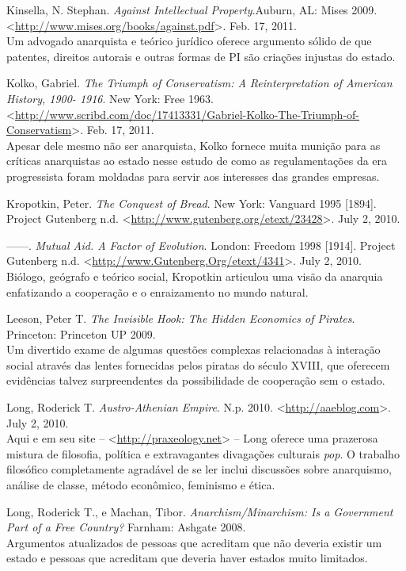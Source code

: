 \begin{hangparas}{0.25in}{1}
Kinsella, N. Stephan. \emph{Against Intellectual Property}.Auburn, AL: Mises 2009. <\url{http://www.mises.org/books/against.pdf}>. Feb. 17, 2011.\smallskip\\
Um advogado anarquista e teórico jurídico oferece argumento sólido de que patentes, direitos autorais e outras formas de PI são criações injustas do estado.

Kolko, Gabriel. \emph{The Triumph of Conservatism: A Reinterpretation of American History, 1900- 1916}. New York: Free 1963. <\url{http://www.scribd.com/doc/17413331/Gabriel-Kolko-The-Triumph-of-Conservatism}>. Feb. 17, 2011.\smallskip\\
Apesar dele mesmo não ser anarquista, Kolko fornece muita munição para as críticas anarquistas ao estado nesse estudo de como as regulamentações da era progressista foram moldadas para servir aos interesses das grandes empresas.

Kropotkin, Peter. \emph{The Conquest of Bread}. New York: Vanguard 1995 [1894]. Project Gutenberg n.d. <\url{http://www.gutenberg.org/etext/23428}>. July 2, 2010.

------. \emph{Mutual Aid. A Factor of Evolution}. London: Freedom 1998 [1914]. Project Gutenberg n.d. <\url{http://www.Gutenberg.Org/etext/4341}>. July 2, 2010.\smallskip\\
Biólogo, geógrafo e teórico social, Kropotkin articulou uma visão da anarquia enfatizando a cooperação e o enraizamento no mundo natural.

Leeson, Peter T. \emph{The Invisible Hook: The Hidden Economics of Pirates}. Princeton: Princeton UP 2009.\smallskip\\
Um divertido exame de algumas questões complexas relacionadas à interação social através das lentes fornecidas pelos piratas do século XVIII, que oferecem evidências talvez surpreendentes da possibilidade de cooperação sem o estado.

Long, Roderick T. \emph{Austro-Athenian Empire}. N.p. 2010. <\url{http://aaeblog.com}>. July 2, 2010.\smallskip\\
Aqui e em seu site -- <\url{http://praxeology.net}> -- Long oferece uma prazerosa mistura de filosofia, política e extravagantes divagações culturais \emph{pop}. O trabalho filosófico completamente agradável de se ler inclui discussões sobre anarquismo, análise de classe, método econômico, feminismo e ética.

Long, Roderick T., e Machan, Tibor. \emph{Anarchism/Minarchism: Is a Government Part of a Free Country?} Farnham: Ashgate 2008.\smallskip\\
Argumentos atualizados de pessoas que acreditam que não deveria existir um estado e pessoas que acreditam que deveria haver estados muito limitados.


\end{hangparas}
